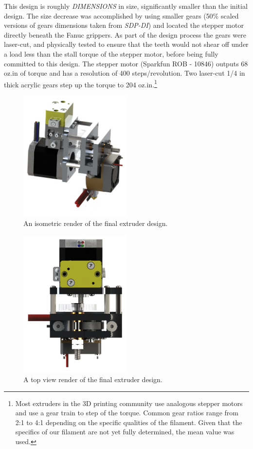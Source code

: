 This design is roughly \emph{\large DIMENSIONS} in size, significantly smaller than the initial design. The size decrease was accomplished by using smaller gears (50\% scaled versions of gears dimensions taken from \emph{SDP-DI}) and located the stepper motor directly beneath the Fanuc grippers. As part of the design process the gears were laser-cut, and physically tested to ensure that the teeth would not shear off under a load less than the stall torque of the stepper motor, before being fully committed to this design. The stepper motor (Sparkfun ROB - 10846) outputs 68 oz.in of torque and has a resolution of 400 steps/revolution. Two laser-cut 1/4 in thick acrylic gears step up the torque to 204 oz.in.\footnote{Most extruders in the 3D printing community use analogous stepper motors and use a gear train to step of the torque. Common gear ratios range from 2:1 to 4:1 depending on the specific qualities of the filament. Given that the specifics of our filament are not yet fully determined, the mean value was used.}

\begin{figure}[htp]
\centering
\includegraphics[width=0.5\textwidth]{./figures/extruder-iso}
\caption{An isometric render of the final extruder design.}
\label{fig:extruder iso}
\end{figure}

\begin{figure}[htp]
\centering
\includegraphics[width=0.5\textwidth]{./figures/extruder-top}
\caption{A top view render of the final extruder design.}
\label{fig:extruder top}
\end{figure}

